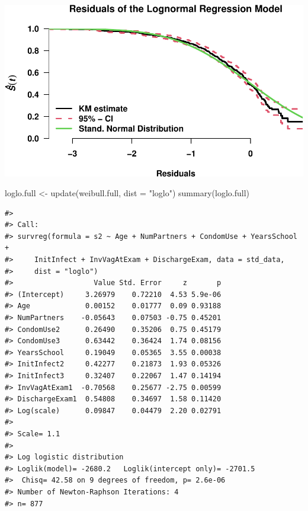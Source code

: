 \documentclass[
]{article}
\newenvironment{Shaded}{\begin{snugshade}}{\end{snugshade}}
\newcommand{\AttributeTok}[1]{\textcolor[rgb]{0.77,0.63,0.00}{#1}}
\newcommand{\FunctionTok}[1]{\textcolor[rgb]{0.00,0.00,0.00}{#1}}
\newcommand{\NormalTok}[1]{#1}
\newcommand{\OtherTok}[1]{\textcolor[rgb]{0.56,0.35,0.01}{#1}}
\newcommand{\StringTok}[1]{\textcolor[rgb]{0.31,0.60,0.02}{#1}}
\begin{document}
\includegraphics{practical_files/figure-latex/fit-lognormal-1.pdf}

\begin{Shaded}
\begin{Highlighting}[]
\NormalTok{loglo.full }\OtherTok{\textless{}{-}} \FunctionTok{update}\NormalTok{(weibull.full, }\AttributeTok{dist =} \StringTok{"loglo"}\NormalTok{)}
\FunctionTok{summary}\NormalTok{(loglo.full)}
\end{Highlighting}
\end{Shaded}

\begin{verbatim}
#> 
#> Call:
#> survreg(formula = s2 ~ Age + NumPartners + CondomUse + YearsSchool + 
#>     InitInfect + InvVagAtExam + DischargeExam, data = std_data, 
#>     dist = "loglo")
#>                   Value Std. Error     z       p
#> (Intercept)     3.26979    0.72210  4.53 5.9e-06
#> Age             0.00152    0.01777  0.09 0.93188
#> NumPartners    -0.05643    0.07503 -0.75 0.45201
#> CondomUse2      0.26490    0.35206  0.75 0.45179
#> CondomUse3      0.63442    0.36424  1.74 0.08156
#> YearsSchool     0.19049    0.05365  3.55 0.00038
#> InitInfect2     0.42277    0.21873  1.93 0.05326
#> InitInfect3     0.32407    0.22067  1.47 0.14194
#> InvVagAtExam1  -0.70568    0.25677 -2.75 0.00599
#> DischargeExam1  0.54808    0.34697  1.58 0.11420
#> Log(scale)      0.09847    0.04479  2.20 0.02791
#> 
#> Scale= 1.1 
#> 
#> Log logistic distribution
#> Loglik(model)= -2680.2   Loglik(intercept only)= -2701.5
#>  Chisq= 42.58 on 9 degrees of freedom, p= 2.6e-06 
#> Number of Newton-Raphson Iterations: 4 
#> n= 877
\end{verbatim}
\end{document}

